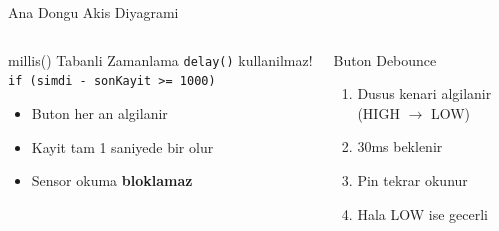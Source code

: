 \begin{frame}{Ana Dongu Akis Diyagrami}
\begin{columns}[T]
      \begin{block}{millis() Tabanli Zamanlama}
        \small
        \texttt{delay()} kullanilmaz!\\[4pt]
        \texttt{if (simdi - sonKayit >= 1000)}\\[4pt]
        \begin{itemize}\small
          \item Buton her an algilanir
          \item Kayit tam 1 saniyede bir olur
          \item Sensor okuma \textbf{bloklamaz}
        \end{itemize}
      \end{block}
      \vspace{6pt}
      \begin{block}{Buton Debounce}
        \small
        \begin{enumerate}
          \item Dusus kenari algilanir\\
                (HIGH $\to$ LOW)
          \item 30ms beklenir
          \item Pin tekrar okunur
          \item Hala LOW ise gecerli
        \end{enumerate}
      \end{block}
  \end{columns}
\end{frame}
